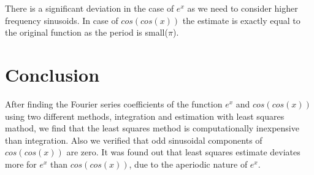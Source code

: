 \documentclass[11pt, a4paper]{article}
\begin{document}
 There is a significant deviation in the case of $e^x$ as we need to consider higher frequency sinusoids. In case of $cos(cos(x))$ the estimate is exactly equal to the original function as the period is small($\pi$).
 
 \section{Conclusion}
 After finding the Fourier series coefficients of the function $e^x$ and $cos(cos(x))$ using two different methods, integration and estimation with least squares mathod, we find that the least squares method is computationally inexpensive than integration. Also we verified that odd sinusoidal components of $cos(cos(x))$ are zero. It was found out that least squares estimate deviates more for $e^x$ than $cos(cos(x))$, due to the aperiodic nature of $e^x$.
\end{document}
